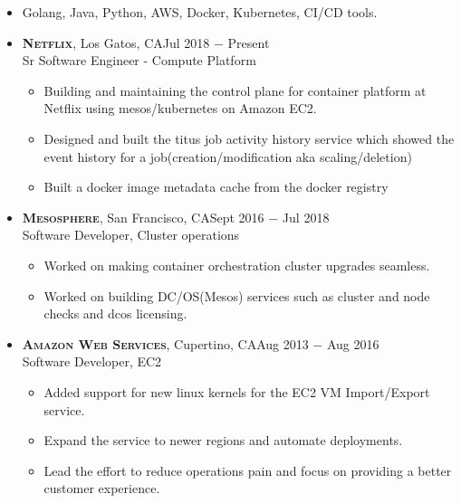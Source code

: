\documentclass[10pt,oneside]{article}
\newcommand{\subheader}[1]{\textsc{\textbf{\large{#1}}}}
\begin{document}
{}
   \begin{itemize}
       \item Golang, Java, Python, AWS, Docker, Kubernetes, CI/CD tools.
   \end{itemize}
{}
\begin{itemize}
      \item
      \subheader{Netflix}, Los Gatos, CA\hfill Jul 2018 $-$ Present\\
      Sr Software Engineer - Compute Platform
      \vspace{-4 pt}
      \begin{itemize}
            \item Building and maintaining the control plane for container platform at Netflix using mesos/kubernetes on Amazon EC2.
            \item Designed and built the titus job activity history service which showed the event history for a job(creation/modification aka scaling/deletion)
            \item Built a docker image metadata cache from the docker registry
      \end{itemize}
  
      \item
      \subheader{Mesosphere}, San Francisco, CA\hfill Sept 2016 $-$ Jul 2018\\
      Software Developer, Cluster operations
      \vspace{-4 pt}
      \begin{itemize}
        \item Worked on making container orchestration cluster upgrades seamless.
	    \item Worked on building DC/OS(Mesos) services such as cluster and node checks and dcos licensing.
      \end{itemize}
      
    \item	
      \subheader{Amazon Web Services}, Cupertino, CA\hfill Aug 2013 $-$ Aug 2016\\
      Software Developer, EC2
      \vspace{-4 pt}
      \begin{itemize}
        \item Added support for new linux kernels for the EC2 VM Import/Export service.
        \item Expand the service to newer regions and automate deployments.
		\item Lead the effort to reduce operations pain and focus on providing a better customer experience.
      \end{itemize} 


\end{itemize}
\end{document}
